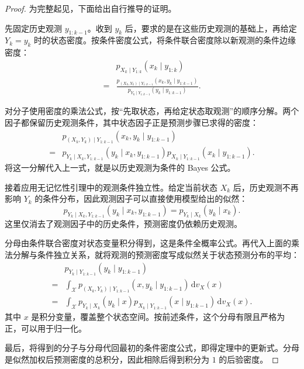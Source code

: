 \begin{proof}
为完整起见，下面给出自行推导的证明。

先固定历史观测 $y_{1:k-1}$。收到 $y_k$ 后，要求的是在这些历史观测的基础上，再给定 $Y_k=y_k$ 时的状态密度。按条件密度公式，将条件联合密度除以新观测的条件边缘密度：
\begin{equation}\label{cw:eq:16}
\begin{aligned}
&p_{X_k\mid Y_{1:k}}(x_k\mid y_{1:k})\\
= &\frac{p_{(X_k,Y_k)\mid Y_{1:k-1}}(x_k,y_k\mid y_{1:k-1})}
{p_{Y_k\mid Y_{1:k-1}}(y_k\mid y_{1:k-1})}.
\end{aligned}
\end{equation}

对分子使用密度的乘法公式，按“先取状态，再给定状态取观测”的顺序分解。两个因子都保留历史观测条件，其中状态因子正是预测步骤已求得的密度：
\begin{equation}\label{cw:eq:17}
\begin{aligned}
&p_{(X_k,Y_k)\mid Y_{1:k-1}}(x_k,y_k\mid y_{1:k-1})\\
= &p_{Y_k\mid X_k,Y_{1:k-1}}(y_k\mid x_k,y_{1:k-1})
p_{X_k\mid Y_{1:k-1}}(x_k\mid y_{1:k-1}).
\end{aligned}
\end{equation}
将这一分解代入上一式，就是以历史观测为条件的 Bayes 公式。

接着应用无记忆性引理中的观测条件独立性。给定当前状态 $X_k$ 后，历史观测不再影响 $Y_k$ 的条件分布，因此观测因子可以直接使用模型给出的似然：
\begin{equation}\label{cw:eq:18}
p_{Y_k\mid X_k,Y_{1:k-1}}(y_k\mid x_k,y_{1:k-1})
=p_{Y_k\mid X_k}(y_k\mid x_k).
\end{equation}
这里仅消去了观测因子中的历史条件，预测密度仍依赖历史观测。

分母由条件联合密度对状态变量积分得到，这是条件全概率公式。再代入上面的乘法分解与条件独立关系，就将观测的预测密度写成似然关于状态预测分布的平均：
\begin{equation}\label{cw:eq:19}
\begin{aligned}
&p_{Y_k\mid Y_{1:k-1}}(y_k\mid y_{1:k-1})\\
= &\int_{\mathcal{X}}p_{(X_k,Y_k)\mid Y_{1:k-1}}(x,y_k\mid y_{1:k-1})\,\mathrm{d}v_X(x)\\
= &\int_{\mathcal{X}}p_{Y_k\mid X_k}(y_k\mid x)
p_{X_k\mid Y_{1:k-1}}(x\mid y_{1:k-1})\,\mathrm{d}v_X(x).
\end{aligned}
\end{equation}
其中 $x$ 是积分变量，覆盖整个状态空间。按前述条件，这个分母有限且严格为正，可以用于归一化。

最后，将得到的分子与分母代回最初的条件密度公式，即得定理中的更新式。分母是似然加权后预测密度的总积分，因此相除后得到积分为 $1$ 的后验密度。
\end{proof}



